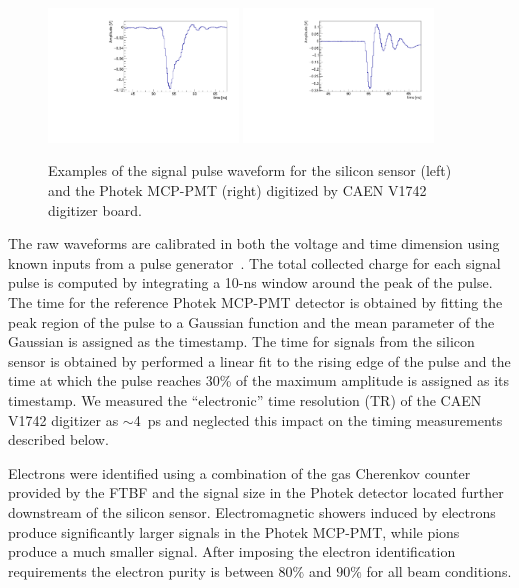 \documentclass[12pt]{article}
\begin{document}
{\begin{figure}[htbp] 
\centering
\includegraphics[width=0.45\textwidth]{plots/ExampleSiliconPadPulse_6X0_16GeV.pdf} 
\includegraphics[width=0.45\textwidth]{plots/ExamplePhotekPulse.pdf} 
\caption{Examples of the signal pulse waveform for the silicon sensor (left) and the Photek MCP-PMT (right) digitized by CAEN V1742 digitizer board.} 
\label{fig:pulses} 
\end{figure} 

The raw waveforms are calibrated in both the voltage and time dimension using
known inputs from a pulse generator~\cite{Kim201467}. The total collected charge for each
signal pulse is computed by integrating a 10-ns window around the peak of the
pulse. The time for the reference Photek MCP-PMT detector is obtained by fitting
the peak region of the pulse to a Gaussian function and the mean parameter of
the Gaussian is assigned as the timestamp. The time for signals from the silicon
sensor is obtained by performed a linear fit to the rising edge of the pulse and
the time at which the pulse reaches 30\% of the maximum amplitude is assigned as
its timestamp. We measured the “electronic” time resolution (TR) of the CAEN
V1742 digitizer as $\sim$4~ps and neglected this impact on the timing measurements
described below.

Electrons were identified using a combination of the gas Cherenkov counter
provided by the FTBF and the signal size in the Photek detector located further
downstream of the silicon sensor. Electromagnetic showers induced by electrons
produce significantly larger signals in the Photek MCP-PMT, while pions produce
a much smaller signal. After imposing the electron identification 
requirements the electron purity is between $80\%$ and $90\%$ for all beam
conditions. 

}
\end{document}
